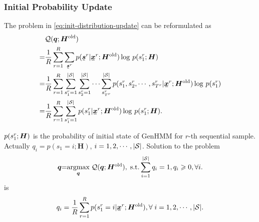 \subsubsection{Initial Probability Update}
The problem in \eqref{eq:init-distribution-update} can be reformulated as
\begin{align}
  &\Qq(\bm{q}; \bm{H}^{\mathrm{old}}) \nonumber \\
  =&\frac{1}{R} \sum_{r=1}^{R}\sum_{\ubmr{s}{r}} {p(\ubmr{s}{r}| \ubmr{x}{r}; \bm{H}^{\mathrm{old}})} \log\,p(\smtr{s}{1}{r};\bm{H}) \nonumber \\
  = & \frac{1}{R}\sum_{r=1}^{R}\sum_{\smtr{s}{1}{r}=1}^{|\Ss|}\sum_{\smtr{s}{2}{r}=1}^{|\Ss|}\cdots \sum_{\smtr{s}{T^{r}}{r}}^{{|\Ss|}} {p(\smtr{s}{1}{r}, \smtr{s}{2}{r}, \cdots, \smtr{s}{T^{r}}{r}| \ubmr{x}{r}; \bm{H}^{\mathrm{old}})} \log\,p(\smtr{s}{1}{r}) \nonumber\\
  =& \frac{1}{R}\sum_{r=1}^{R}\sum_{\smtr{s}{1}{r}=1}^{|\Ss|}{p(\smtr{s}{1}{r}| \ubmr{x}{r}; \bm{H}^{\mathrm{old}})} \log\,p(\smtr{s}{1}{r};\bm{H}).
\end{align}

$p(\smtr{s}{1}{r};\bm{H})$ is the probability of initial state of GenHMM for $r$-th sequential sample. Actually $q_i = p({s}_{1} =i;\bm{H}) $, $i= 1, 2, \cdots, |\Ss|$. Solution to the problem
\begin{align}
  \bm{q} \hspace{-0.1cm} = \hspace{-0.1cm} \uargmax{\bm{q}} \Qq(\bm{q}; \bm{H}^{\mathrm{old}}),\; \mathrm{s.t.} \sum_{i=1}^{ |\Ss| }q_i = 1, q_i \geq 0, \forall i.
\end{align}
is
\begin{equation}\label{eq:update-initial-state-prob}
  q_i = \frac{1}{R} \sum_{r=1}^{R} p(\smtr{s}{1}{r}=i | \ubmr{x}{r}; \bm{H}^{\mathrm{old}}), \forall\; i = 1, 2, \cdots, |\Ss|.
\end{equation}

